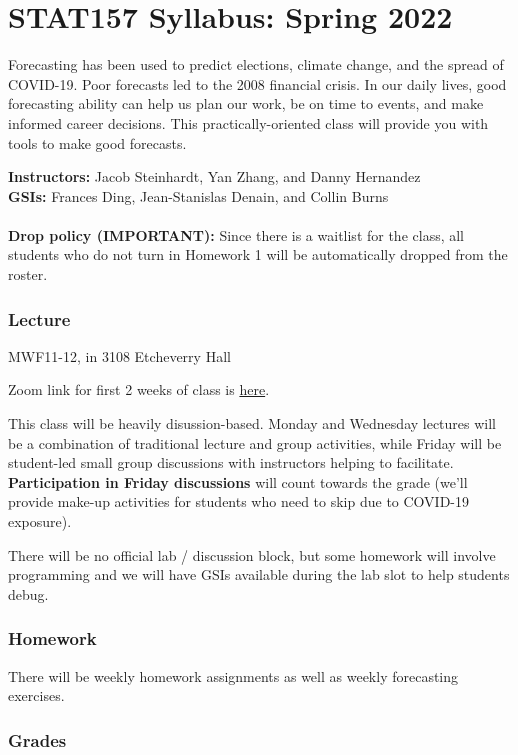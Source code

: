 \documentclass[11pt]{article}
\begin{document}
\section*{STAT157 Syllabus: Spring 2022}

Forecasting has been used to predict elections, climate change, and the spread of COVID-19. Poor forecasts led to the 2008 financial crisis. In our daily lives, good forecasting ability can help us plan our work, be on time to events, and make informed career decisions. This practically-oriented class will provide you with tools to make good forecasts.

{\bf Instructors:} Jacob Steinhardt, Yan Zhang, and Danny Hernandez\\ {\bf GSIs:} Frances Ding, Jean-Stanislas Denain, and Collin Burns\\
\\
{\bf Drop policy (IMPORTANT):} Since there is a waitlist for the class, all students who do not turn in Homework 1 will be automatically dropped from the roster.

\subsubsection*{Lecture}

MWF11-12, in 3108 Etcheverry Hall

Zoom link for first 2 weeks of class is \href{https://berkeley.zoom.us/j/93592932586?pwd=Y1hBNEp4OGVqWHMvOXZKcmd1L0d6QT09}{here}.

This class will be heavily disussion-based. Monday and Wednesday lectures will be a combination of traditional lecture and group activities, 
while Friday will be student-led small group discussions with instructors helping to facilitate. {\bf Participation in Friday discussions} 
will count towards the grade (we'll provide make-up activities for students who need to skip due to COVID-19 exposure).

There will be no official lab / discussion block, but some homework will involve programming and we will have GSIs available during the lab slot to help students debug.

\subsubsection*{Homework}

There will be weekly homework assignments as well as weekly forecasting exercises.

\subsubsection*{Grades}
\end{document}
